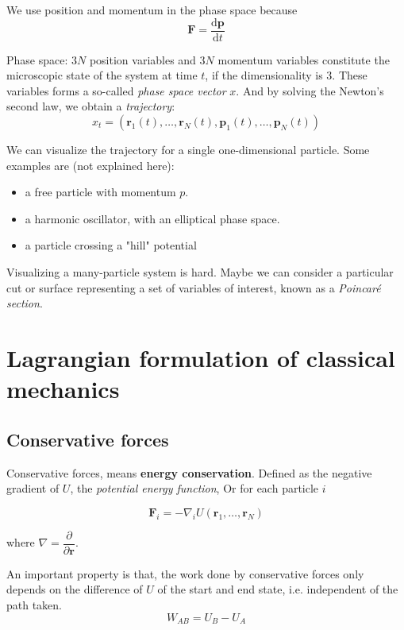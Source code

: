 \documentclass[
  10pt,
  twoside,
  openany,
  b5paper, %
  colorscheme = bootstrap-v4, %
]{qyxf-book}
\numberwithin{equation}{section}
\newcommand{\md}{\mathrm{d}}
\newcommand{\der}[2]{\dfrac{\md #1}{\md #2}}
\newcommand{\p}[2]{\dfrac{\partial #1}{\partial #2}}
\newcommand{\vF}{\boldsymbol{F}}
\newcommand{\vr}{\boldsymbol{r}}
\newcommand{\vp}{\boldsymbol{p}}
\newcommand{\vl}{\boldsymbol{l}}
\begin{document}
We use position and momentum in the phase space because
\begin{equation}
	\vF=\der{\vp}{t} \label{rp}
\end{equation}

Phase space: $3N$ position variables and $3N$ momentum variables constitute the microscopic state of the system at time $t$, if the dimensionality is 3. These variables forms a so-called \textit{phase space vector} $x$. And by solving the Newton's second law, we obtain a \textit{trajectory}:
\begin{equation}
	x_t=\left(\vr_1(t), \dots, \vr_N(t), \vp_1(t), \dots, \vp_N(t)\right) \label{eq:phase-space-vector}
\end{equation}

We can visualize the trajectory for a single one-dimensional particle. Some examples are (not explained here):
\begin{itemize}
	\item a free particle with momentum $p$.
	\item a harmonic oscillator, with an elliptical phase space.
	\item a particle crossing a "hill" potential
\end{itemize}

Visualizing a many-particle system is hard. Maybe we can consider a particular cut or surface representing a set of variables of interest, known as a \textit{Poincar{\'e} section}.

\section{Lagrangian formulation of classical mechanics}

\vspace{0.5em}
\subsection{Conservative forces}
Conservative forces, means \textbf{energy conservation}. Defined as the negative gradient of $U$, the \textit{potential energy function}, Or for each particle $i$
\begin{tcolorbox}
	\begin{equation}
		\vF_i=-\nabla_i U(\vr_1,\dots,\vr_N) \label{eq:conservative}
	\end{equation}
\end{tcolorbox}
where $\nabla=\p{}{\vr}$. 

An important property is that, the work done by conservative forces only depends on the difference of $U$ of the start and end state, i.e. independent of the path taken. 
$$
W_{AB}=U_B-U_A
$$
\end{document}
